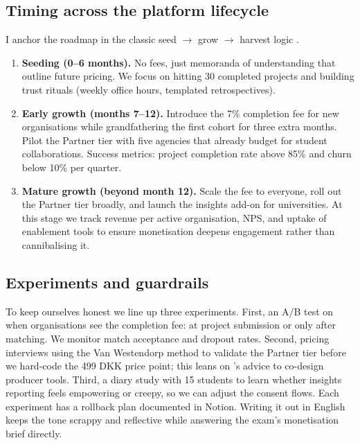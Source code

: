 \subsection*{Timing across the platform lifecycle}
I anchor the roadmap in the classic seed $\rightarrow$ grow $\rightarrow$ harvest logic \citep{Choudary2016}.
\begin{enumerate}
  \item \textbf{Seeding (0--6 months).} No fees, just memoranda of understanding that outline future pricing. We focus on hitting 30 completed projects and building trust rituals (weekly office hours, templated retrospectives).
  \item \textbf{Early growth (months 7--12).} Introduce the 7\% completion fee for new organisations while grandfathering the first cohort for three extra months. Pilot the Partner tier with five agencies that already budget for student collaborations. Success metrics: project completion rate above 85\% and churn below 10\% per quarter.
  \item \textbf{Mature growth (beyond month 12).} Scale the fee to everyone, roll out the Partner tier broadly, and launch the insights add-on for universities. At this stage we track revenue per active organisation, NPS, and uptake of enablement tools to ensure monetisation deepens engagement rather than cannibalising it.
\end{enumerate}

\subsection*{Experiments and guardrails}
To keep ourselves honest we line up three experiments. First, an A/B test on when organisations see the completion fee: at project submission or only after matching. We monitor match acceptance and dropout rates. Second, pricing interviews using the Van Westendorp method to validate the Partner tier before we hard-code the 499 DKK price point; this leans on \citet{Reillier2017}'s advice to co-design producer tools. Third, a diary study with 15 students to learn whether insights reporting feels empowering or creepy, so we can adjust the consent flows. Each experiment has a rollback plan documented in Notion. Writing it out in English keeps the tone scrappy and reflective while answering the exam's monetisation brief directly.
